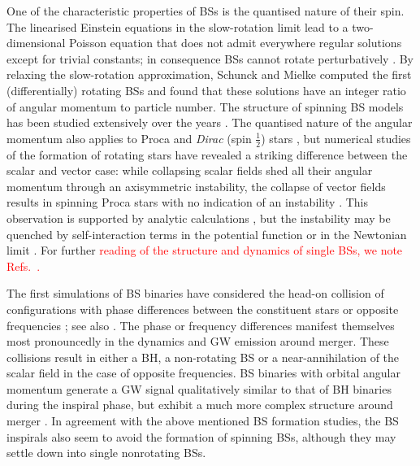\documentclass[]{iopart}
\newcommand{\rc}[1]{\textcolor{blue}{[{\it\textbf{RC: #1}}]} }
\newcommand{\new}[1]{\textcolor{red}{#1}}
\begin{document}
One of the characteristic properties of BSs is the quantised nature
of their spin. The linearised Einstein equations in the slow-rotation
limit lead to a two-dimensional Poisson equation that does not admit
everywhere regular solutions except for trivial constants; in
consequence BSs cannot rotate perturbatively \cite{Kobayashi:1994qi}.
By relaxing the slow-rotation approximation, Schunck and Mielke
\cite{Schunck:1996he} computed the first (differentially) rotating
BSs and found that these solutions have an integer ratio of angular
momentum to particle number. The structure of spinning BS models
has been studied extensively over the years
\cite{Ryan:1996nk,Yoshida:1997jq,Yoshida:1997qf,Yoshida:1997nd,Schunck:1999pm,Kleihaus:2005me,Kleihaus:2007vk,Kleihaus:2011sx,Collodel:2017biu}.
The quantised nature of the angular momentum also applies to Proca
and {\it Dirac} (spin $\tfrac{1}{2}$) stars \cite{Herdeiro:2019mbz},
but numerical studies of the formation of rotating stars have
revealed a striking difference between the scalar and vector case:
while collapsing scalar fields shed all their angular momentum
through an axisymmetric instability, the collapse of vector fields
results in spinning Proca stars with no indication of an instability
\cite{Sanchis-Gual:2019ljs,DiGiovanni:2020ror}.  This observation
is supported by analytic calculations \cite{Dmitriev:2021utv}, but
the instability may be quenched by self-interaction terms in the
potential function or in the Newtonian limit \cite{Siemonsen:2020hcg}.
For further \new{reading of the structure and dynamics of single BSs,
we note Refs.~\cite{Mielke:1997re,Mielke:2000mh,Mundim:2010hi,Liebling:2012fv,Macedo:2013jja}.}

The first simulations of BS binaries have considered the head-on
collision of configurations with phase differences between the
constituent stars or opposite frequencies \cite{Palenzuela:2006wp};
see also \cite{Choptuik:2009ww,Bezares:2017mzk}. The phase or
frequency differences manifest themselves most pronouncedly in the
dynamics and GW emission around merger.
These collisions
result in either a BH, a non-rotating BS or a near-annihilation of
the scalar field in the case of opposite frequencies. BS binaries
with orbital angular momentum generate a GW signal qualitatively
similar to that of BH binaries during the inspiral phase, but exhibit
a much more complex structure around merger
\cite{Palenzuela:2007dm,Palenzuela:2017kcg}.  In agreement with the
above mentioned BS formation studies, the BS inspirals also seem
to avoid the formation of spinning BSs, although they may settle
down into single nonrotating BSs.
\end{document}
